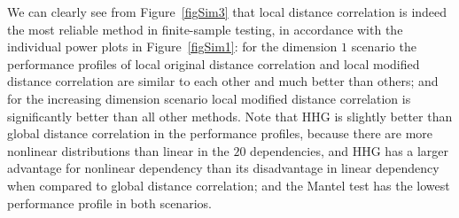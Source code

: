 \documentclass[11pt]{article}
\begin{document}
We can clearly see from Figure~\ref{figSim3} that local distance correlation is indeed the most reliable method in finite-sample testing, in accordance with the individual power plots in Figure~\ref{figSim1}: for the dimension $1$ scenario the performance profiles of local original distance correlation and local modified distance correlation are similar to each other and much better than others; and for the increasing dimension scenario local modified distance correlation is significantly better than all other methods. Note that HHG is slightly better than global distance correlation in the performance profiles, because there are more nonlinear distributions than linear in the $20$ dependencies, and HHG has a larger advantage for nonlinear dependency than its disadvantage in linear dependency when compared to global distance correlation; and the Mantel test has the lowest performance profile in both scenarios.
\end{document}

